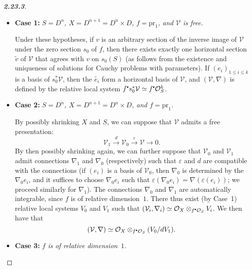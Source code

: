 \documentclass{report}
\renewcommand{\cal}[1]{{\mathcal{#1}}}
\newcommand{\sbullet}{{\mathbin{\vcenter{\hbox{\scalebox{.5}{$\bullet$}}}}}}
\newcommand{\pr}{\mathrm{pr}}
\renewcommand{\leq}{\leqslant}
\newcommand{\oldpage}[1]{\marginpar{\footnotesize$\Big\vert$ \textit{p.~#1}}}
\begin{document}
\begin{proof}[\normalfont\textbf{2.23.3}]
  \begin{itemize}
    \item[] \textbf{Case 1:} \emph{$S=D^n$, $X=D^{n+1}=D^n\times D$, $f=\pr_1$, and $\cal{V}$ is free.}

      Under these hypotheses, if $v$ is an arbitrary section of the inverse image of $\cal{V}$ under the zero section $s_0$ of $f$, then there exists exactly one horizontal section $\widetilde{v}$ of $\cal{V}$ that agrees with $v$ on $s_0(S)$ (as follows from the existence and uniqueness of solutions for Cauchy problems with parameters).
      If $(e_i)_{1\leq i\leq k}$ is a basis of $s_0^*\cal{V}$, then the $\widetilde{e_i}$ form a horizontal basis of $\cal{V}$, and $(\cal{V},{\nabla})$ is defined by the relative local system $f^\sbullet s_0^*\cal{V}\simeq f^\sbullet\cal{O}_S^k$.
    \item[] \textbf{Case 2:} \emph{$S=D^n$, $X=D^{n+1}=D^n\times D$, and $f=\pr_1$.}

      By possibly shrinking $X$ and $S$, we can suppose that $\cal{V}$ admits a free presentation:
      \[
        \cal{V}_1 \xrightarrow{d} \cal{V}_0 \xrightarrow{\varepsilon} \cal{V} \to 0.
      \]
      By then possibly shrinking again, we can further suppose that $\cal{V}_0$ and $\cal{V}_1$ admit connections $\nabla_1$ and $\nabla_0$ (respectively) such that $\varepsilon$ and $d$ are compatible with the connections (if $(e_i)$ is a basis of $\cal{V}_0$, then $\nabla_0$ is determined by the $\nabla_0 e_i$, and it suffices to choose $\nabla_0 e_i$ such that $\varepsilon(\nabla_0 e_i)=\nabla(\varepsilon(e_i))$; we proceed similarly for $\nabla_1$).
      The connections $\nabla_0$ and $\nabla_1$ are automatically integrable, since $f$ is of relative dimension~$1$.
      There thus exist (by Case~1) relative local systems $V_0$ and $V_1$ such that $(\cal{V}_i,\nabla_i)\simeq\cal{O}_X\otimes_{f^\sbullet\cal{O}_S}V_i$.
      We then have that
      \[
        (\cal{V},\nabla) \simeq \cal{O}_X\otimes_{f^\sbullet\cal{O}_S}(V_0/dV_1).
      \]
\oldpage{18}
    \item[] \textbf{Case 3:} \emph{$f$ is of relative dimension~$1$.}


\end{itemize}
\end{proof}
\end{document}
